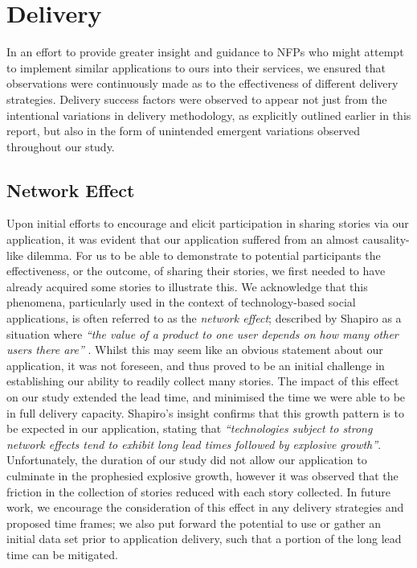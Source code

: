 \section{Delivery}

In an effort to provide greater insight and guidance to NFPs who might attempt to implement similar applications to ours into their services, we ensured that observations were continuously made as to the effectiveness of different delivery strategies. Delivery success factors were observed to appear not just from the intentional variations in delivery methodology, as explicitly outlined earlier in this report, but also in the form of unintended emergent variations observed throughout our study.

\subsection{Network Effect}

Upon initial efforts to encourage and elicit participation in sharing stories via our application, it was evident that our application suffered from an almost causality-like dilemma. For us to be able to demonstrate to potential participants the effectiveness, or the outcome, of sharing their stories, we first needed to have already acquired some stories to illustrate this. We acknowledge that this phenomena, particularly used in the context of technology-based social applications, is often referred to as the \emph{network effect}; described by Shapiro as a situation where \emph{“the value of a product to one user depends on how many other users there are”} \cite{shapiro1998information}. Whilst this may seem like an obvious statement about our application, it was not foreseen, and thus proved to be an initial challenge in establishing our ability to readily collect many stories. The impact of this effect on our study extended the lead time, and minimised the time we were able to be in full delivery capacity. Shapiro's insight confirms that this growth pattern is to be expected in our application, stating that \emph{“technologies subject to strong network effects tend to exhibit long lead times followed by explosive growth”}. Unfortunately, the duration of our study did not allow our application to culminate in the prophesied explosive growth, however it was observed that the friction in the collection of stories reduced with each story collected. In future work, we encourage the consideration of this effect in any delivery strategies and proposed time frames; we also put forward the potential to use or gather an initial data set prior to application delivery, such that a portion of the long lead time can be mitigated.

